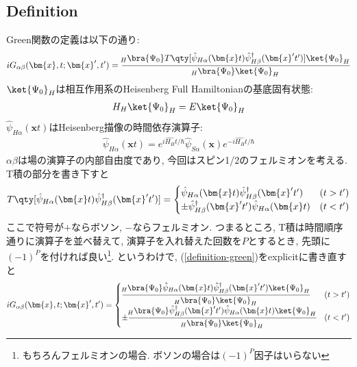 \documentclass[10.5pt,a4paper]{jreport}
\begin{document}
\subsection{Definition}
Green関数の定義は以下の通り:
\begin{eqnarray}
  iG_{\alpha\beta}(\bm{x}, t;\bm{x}', t') = \frac{\!_H\bra{\Psi_0}T\qty[\hat{\psi}_{H\alpha}(\bm{x}t)\hat{\psi}_{H\beta}^\dagger(\bm{x}'t')]\ket{\Psi_0}_H}{\!_H\bra{\Psi_0}\ket{\Psi_0}_H}\label{definition-green}
\end{eqnarray}
$\ket{\Psi_0}_H$は相互作用系のHeisenberg Full Hamiltonianの基底固有状態:
\begin{eqnarray}
  H_H\ket{\Psi_0}_H = E\ket{\Psi_0}_H 
\end{eqnarray}
$\hat{\psi}_{H\alpha}(\bm{x}t)$はHeisenberg描像の時間依存演算子:
\begin{eqnarray}
  \hat{\psi}_{H\alpha}(\bm{x}t) = e^{i\hat{H_H}t/\hbar}\hat{\psi}_{S\alpha}(\bm{x})e^{-i\hat{H_H}t/\hbar}
\end{eqnarray}
$\alpha\beta$は場の演算子の内部自由度であり, 今回はスピン1/2のフェルミオンを考える. T積の部分を書き下すと
\begin{eqnarray}
  T\qty[\hat{\psi}_{H\alpha}(\bm{x}t)\hat{\psi}_{H\beta}^\dagger(\bm{x}'t')] =
  \begin{cases}
    \hat{\psi}_{H\alpha}(\bm{x}t)\hat{\psi}_{H\beta}^\dagger(\bm{x}'t') & (t > t')\\
    \pm\hat{\psi}_{H\beta}^\dagger(\bm{x}'t')\hat{\psi}_{H\alpha}(\bm{x}t) & (t < t')
  \end{cases}
\end{eqnarray}
ここで符号が$+$ならボソン, $-$ならフェルミオン. つまるところ, T積は時間順序通りに演算子を並べ替えて, 演算子を入れ替えた回数を$P$とするとき, 先頭に$(-1)^P$を付ければ良い\footnote{もちろんフェルミオンの場合. ボソンの場合は$(-1)^P$因子はいらない}. というわけで, (\ref{definition-green})をexplicitに書き直すと
\begin{eqnarray}
  iG_{\alpha\beta}(\bm{x}, t;\bm{x}', t') =
  \begin{cases}
    \cfrac{\!_H\bra{\Psi_0}\hat{\psi}_{H\alpha}(\bm{x}t)\hat{\psi}_{H\beta}^\dagger(\bm{x}'t')\ket{\Psi_0}_H}{\!_H\bra{\Psi_0}\ket{\Psi_0}_H} & (t > t')\\
    \pm\cfrac{\!_H\bra{\Psi_0}\hat{\psi}_{H\beta}^\dagger(\bm{x}'t')\hat{\psi}_{H\alpha}(\bm{x}t)\ket{\Psi_0}_H}{\!_H\bra{\Psi_0}\ket{\Psi_0}_H} & (t < t')
  \end{cases}
  \label{definition-green2}
\end{eqnarray}
\end{document}
